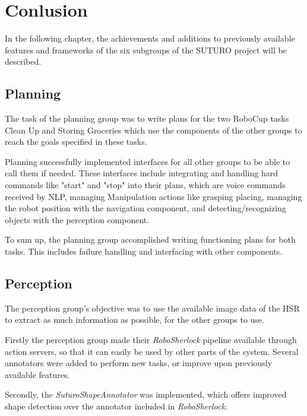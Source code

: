 \documentclass[main.tex]{subfiles}
\begin{document}
	\begingroup

	\renewcommand{\cleardoublepage}{}

	\renewcommand{\clearpage}{}

	\chapter{Conlusion}
		In the following chapter, the achievements and additions to previously available features and frameworks of the six subgroups of the SUTURO project will be described.
		
		\section{Planning}
		The task of the planning group was to write plans for the two RoboCup tasks Clean Up and Storing Groceries which use the components of the other groups to reach the goals specified in these tasks.
		
		Planning successfully implemented interfaces for all other groups to be able to call them if needed. These interfaces include integrating and handling hard commands like "start" and "stop" into their plans, which are voice commands received by NLP, managing Manipulation actions like grasping placing, managing the robot position with the navigation component, and detecting/recognizing objects with the perception component.
		
		To sum up, the planning group accomplished writing functioning plans for both tasks. This includes failure handling and interfacing with other components.
		
		\section{Perception}
		The perception group's objective was to use the available image data of the HSR to extract as much information as possible, for the other groups to use.
				
		Firstly the perception group made their \textit{RoboSherlock} pipeline available through action servers, so that it can easily be used by other parts of the system. Several annotators were added to perform new tasks, or improve upon previously available features. 
		
		Secondly, the \textit{SuturoShapeAnnotator} was implemented, which offers improved shape detection over the annotator included in \textit{RoboSherlock}. 
		
\end{document}
